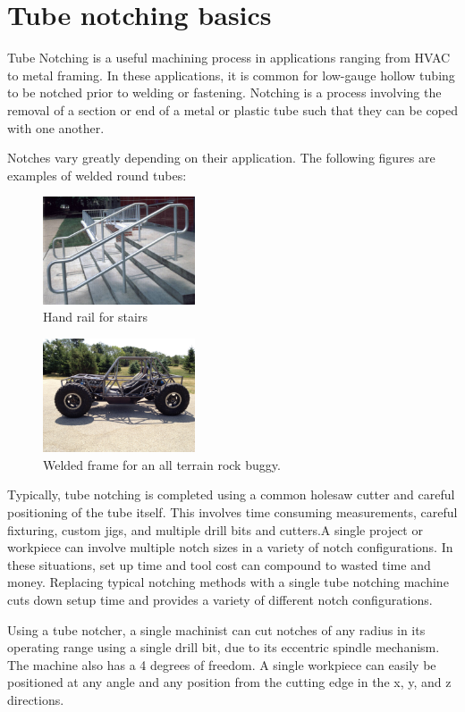 \chapter{Tube notching basics}

Tube Notching is a useful machining process in applications ranging from HVAC to metal framing. In these applications, it is common for low-gauge hollow tubing to be notched prior to welding or fastening. Notching is a process involving the removal of a section or end of a metal or plastic tube such that they can be coped with one another. 

Notches vary greatly depending on their application. The following figures are examples of welded round tubes:
\begin{figure}[htp]
    \centering
    \includegraphics[width=0.4\textwidth]{./fall-report pictures/Chapter1-Basics/Railing}
    \caption{Hand rail for stairs}
    \label{fig:Stairs}
\end{figure}
\begin{figure}[htp]
    \centering
    \includegraphics[width=0.4\textwidth]{./fall-report pictures/Chapter1-Basics/Rock Buggy}
    \caption{Welded frame for an all terrain rock buggy.}
    \label{fig:Frame}
\end{figure}
\newpage
Typically, tube notching is completed using a common holesaw cutter and careful positioning of the tube itself. This involves time consuming measurements, careful fixturing, custom jigs, and multiple drill bits and cutters.A single project or workpiece can involve multiple notch sizes in a variety of notch configurations. In these situations, set up time and tool cost can compound to wasted time and money. Replacing typical notching methods with a single tube notching machine cuts down setup time and provides a variety of different notch configurations.

Using a tube notcher, a single machinist can cut  notches of any radius in its operating range using a single drill bit, due to its eccentric spindle mechanism. The machine also has a 4 degrees of freedom. A single workpiece can easily be positioned at any angle and any position from the cutting edge in the x, y, and z directions. 

